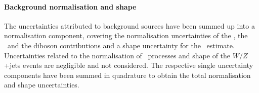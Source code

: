 \paragraph{Background normalisation and shape}\mbox{}
%
The uncertainties attributed to background sources have been summed up into a normalisation component, covering the normalisation uncertainties of the \fake, the \Zj\ and the diboson contributions and a shape uncertainty for the \fake\ estimate. Uncertainties related to the normalisation of \Wj\ processes and shape of the $W/Z$+jets events are negligible and not considered. 
%
The respective single uncertainty components have been summed in quadrature to obtain the total normalisation and shape uncertainties.
%
%
%
%
%
\begin{figure}[tbp!]
\centering
{}
\hfill
{}
\end{figure}
